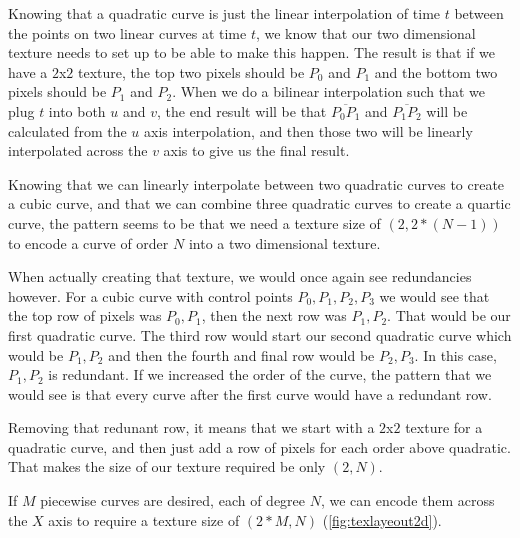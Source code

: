 \documentclass{jcgt}
\begin{document}
Knowing that a quadratic curve is just the linear interpolation of time $t$ between the points on two linear curves at time $t$, we know that our two dimensional texture needs to set up to be able to make this happen.  The result is that if we have a $2$x$2$ texture, the top two pixels should be $P_0$ and $P_1$ and the bottom two pixels should be $P_1$ and $P_2$.  When we do a bilinear interpolation such that we plug $t$ into both $u$ and $v$, the end result will be that $\overline{P_0P_1}$ and $\overline{P_1P_2}$ will be calculated from the $u$ axis interpolation, and then those two will be linearly interpolated across the $v$ axis to give us the final result.

Knowing that we can linearly interpolate between two quadratic curves to create a cubic curve, and that we can combine three quadratic curves to create a quartic curve, the pattern seems to be that we need a texture size of $(2,2*(N-1))$ to encode a curve of order $N$ into a two dimensional texture.

When actually creating that texture, we would once again see redundancies however.  For a cubic curve with control points $P_0,P_1,P_2,P_3$ we would see that the top row of pixels was $P_0,P_1$, then the next row was $P_1,P_2$.  That would be our first quadratic curve.  The third row would start our second quadratic curve which would be $P_1,P_2$ and then the fourth and final row would be $P_2,P_3$.  In this case, $P_1,P_2$ is redundant.  If we increased the order of the curve, the pattern that we would see is that every curve after the first curve would have a redundant row.

Removing that redunant row, it means that we start with a $2$x$2$ texture for a quadratic curve, and then just add a row of pixels for each order above quadratic.  That makes the size of our texture required be only $(2,N)$.

If $M$ piecewise curves are desired, each of degree $N$, we can encode them across the $X$ axis to require a texture size of $(2*M,N)$ (\autoref{fig:texlayeout2d}).
\end{document}
